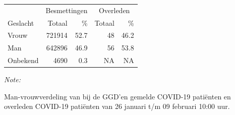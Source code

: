 \documentclass[
  english,
  man,floatsintext]{apa6}
\begin{document}
\begin{table}
\centering\begingroup\fontsize{11}{13}\selectfont

\begin{threeparttable}
\begin{tabular}{lrrrr}
\toprule
\multicolumn{1}{c}{ } & \multicolumn{2}{c}{Besmettingen} & \multicolumn{2}{c}{Overleden} \\
\cmidrule(l{3pt}r{3pt}){2-3} \cmidrule(l{3pt}r{3pt}){4-5}
Geslacht & Totaal & \% & Totaal & \%\\
\midrule
Vrouw & 721914 & 52.7 & 48 & 46.2\\
Man & 642896 & 46.9 & 56 & 53.8\\
Onbekend & 4690 & 0.3 & NA & NA\\
\bottomrule
\end{tabular}
\begin{tablenotes}
\item \textit{Note: } 
\item Man-vrouwverdeling van bij de GGD’en gemelde COVID-19 patiënten en overleden COVID-19 patiënten van 26 januari t/m 09 februari 10:00 uur.
\end{tablenotes}
\end{threeparttable}
\endgroup{}
\end{table}
\newpage
\end{document}
